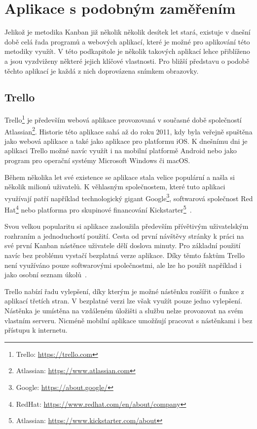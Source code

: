 \blindtext[2] %

\section{Aplikace s podobným zaměřením}
Jelikož je metodika Kanban již několik několik desítek let stará, existuje v dnešní době celá řada programů a webových aplikací, které je možné pro aplikování této metodiky využít. V této podkapitole je několik takových aplikací lehce přiblíženo a jsou vyzdviženy některé jejich klíčové vlastnosti. Pro bližší představu o podobě těchto aplikací je každá z nich doprovázena snímkem obrazovky.

\subsection{Trello}
Trello\footnote{Trello: \url{https://trello.com}} je především webová aplikace provozovaná v současné době společností Atlassian\footnote{Atlassian: \url{https://www.atlassian.com}}. Historie této aplikace sahá až do roku 2011, kdy byla veřejně spuštěna jako webová aplikace a také jako aplikace pro platformu iOS. K dnešnímu dni je aplikaci Trello možné navíc využít i na mobilní platformě Android nebo jako program pro operační systémy Microsoft Windows či macOS. 

Během několika let své existence se aplikace stala velice populární a našla si několik milionů uživatelů. K věhlasným společnostem, které tuto aplikaci využívají patří například technologický gigant Google\footnote{Google: \url{https://about.google/}}, softwarová společnost Red Hat\footnote{RedHat: \url{https://www.redhat.com/en/about/company}} nebo platforma pro skupinové financování Kickstarter\footnote{Atlassian: \url{https://www.kickstarter.com/about}}~\cite{bib:trello-about}. 

Svou velkou popularitu si aplikace zasloužila především přívětivým uživatelským rozhraním a jednoduchostí použití. Cesta od první návštěvy stránky k práci na své první Kanban nástěnce uživatele dělí doslova minuty. Pro základní použití navíc bez problému vystačí bezplatná verze aplikace. Díky těmto faktům Trello není využíváno pouze softwarovými společnostmi, ale lze ho použít například i jako osobní seznam úkolů~\cite{bib:jira-vs-trello}.

Trello nabízí řadu vylepšení, díky kterým je možné nástěnku rozšířit o funkce z aplikací třetích stran. 
V bezplatné verzi lze však využít pouze jedno vylepšení.
Nástěnka je umístěna na vzdáleném úložišti a službu nelze provozovat na svém vlastním serveru. Nicméně mobilní aplikace umožňují pracovat s nástěnkami i bez přístupu k internetu.

